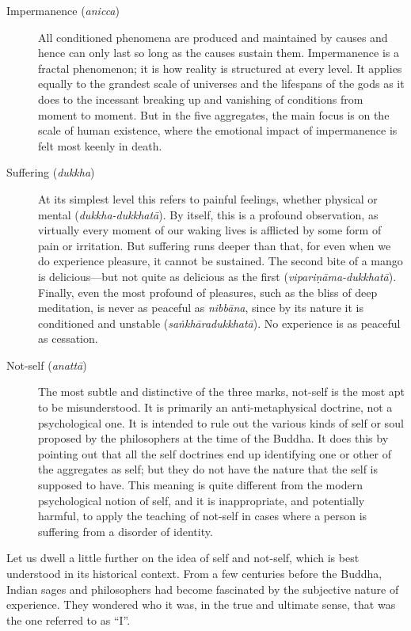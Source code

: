 \documentclass[12pt,openany]{book}%
\begin{document}
\begin{description}%
\item[Impermanence (\textit{anicca})] All conditioned phenomena are produced and maintained by causes and hence can only last so long as the causes sustain them. Impermanence is a fractal phenomenon; it is how reality is structured at every level. It applies equally to the grandest scale of universes and the lifespans of the gods as it does to the incessant breaking up and vanishing of conditions from moment to moment. But in the five aggregates, the main focus is on the scale of human existence, where the emotional impact of impermanence is felt most keenly in death.%
\item[Suffering (\textit{dukkha})] At its simplest level this refers to painful feelings, whether physical or mental (\textit{dukkha-\textsanskrit{dukkhatā}}). By itself, this is a profound observation, as virtually every moment of our waking lives is afflicted by some form of pain or irritation. But suffering runs deeper than that, for even when we do experience pleasure, it cannot be sustained. The second bite of a mango is delicious—but not quite as delicious as the first (\textit{\textsanskrit{vipariṇāma}-\textsanskrit{dukkhatā}}). Finally, even the most profound of pleasures, such as the bliss of deep meditation, is never as peaceful as \textit{\textsanskrit{nibbāna}}, since by its nature it is conditioned and unstable (\textit{\textsanskrit{saṅkhāradukkhatā}}). No experience is as peaceful as cessation.%
\item[Not-self (\textit{\textsanskrit{anattā}})] The most subtle and distinctive of the three marks, not-self is the most apt to be misunderstood. It is primarily an anti-metaphysical doctrine, not a psychological one. It is intended to rule out the various kinds of self or soul proposed by the philosophers at the time of the Buddha. It does this by pointing out that all the self doctrines end up identifying one or other of the aggregates as self; but they do not have the nature that the self is supposed to have. This meaning is quite different from the modern psychological notion of self, and it is inappropriate, and potentially harmful, to apply the teaching of not-self in cases where a person is suffering from a disorder of identity.%
\end{description}

Let us dwell a little further on the idea of self and not-self, which is best understood in its historical context. From a few centuries before the Buddha, Indian sages and philosophers had become fascinated by the subjective nature of experience. They wondered who it was, in the true and ultimate sense, that was the one referred to as “I”.
\end{document}

